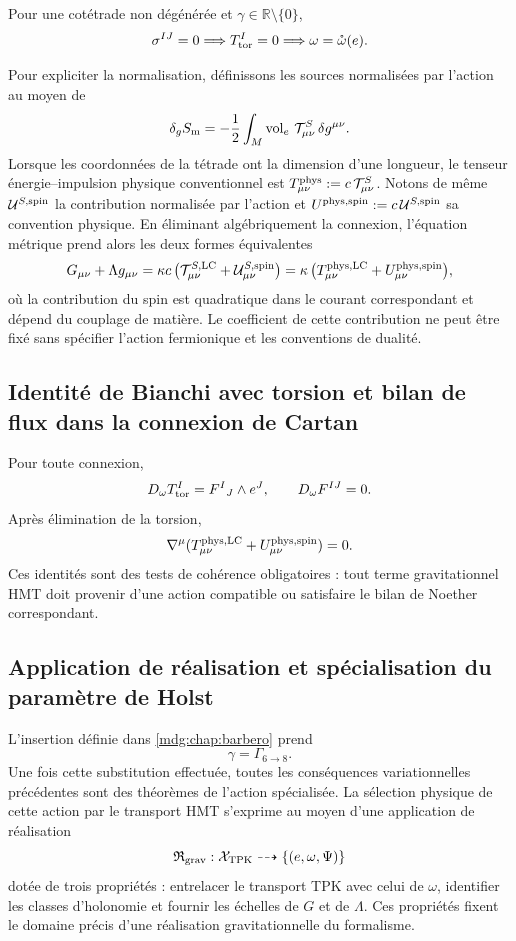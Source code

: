 \begin{corollary}
Pour une cotétrade non dégénérée et \(\gamma\in\mathbb R\setminus\{0\}\),
\[
 \sigma^{IJ}=0\Longrightarrow T_{\rm tor}^I=0
 \Longrightarrow\omega=\mathring\omega(e).
\]
\end{corollary}

Pour expliciter la normalisation, définissons les sources normalisées par l’action au moyen de
\[
 \delta_g S_{\rm m}
 =-\frac12\int_M\operatorname{vol}_e\,
 \mathcal T^{S}_{\mu\nu}\,\delta g^{\mu\nu}.
\]
Lorsque les coordonnées de la tétrade ont la dimension d’une longueur, le tenseur énergie--impulsion physique conventionnel est \(T^{\rm phys}_{\mu\nu}:=c\,\mathcal T^{S}_{\mu\nu}\). Notons de même \(\mathcal U^{S,\rm spin}\) la contribution normalisée par l’action et \(U^{\rm phys,\rm spin}:=c\,\mathcal U^{S,\rm spin}\) sa convention physique. En éliminant algébriquement la connexion, l’équation métrique prend alors les deux formes équivalentes
\[
 G_{\mu\nu}+\Lambda g_{\mu\nu}
 =\kappa c\,
 \bigl(\mathcal T_{\mu\nu}^{S,\rm LC}
       +\mathcal U_{\mu\nu}^{S,\rm spin}\bigr)
 =\kappa\,
 \bigl(T_{\mu\nu}^{\rm phys,LC}
       +U_{\mu\nu}^{\rm phys,spin}\bigr),
\]
où la contribution du spin est quadratique dans le courant correspondant et dépend du couplage de matière. Le coefficient de cette contribution ne peut être fixé sans spécifier l’action fermionique et les conventions de dualité.

\subsection{Identité de Bianchi avec torsion et bilan de flux dans la connexion de Cartan}

Pour toute connexion,
\[
 D_\omega T_{\rm tor}^I=F^I{}_J\wedge e^J,
 \qquad
 D_\omega F^{IJ}=0.
\]
Après élimination de la torsion,
\[
\nabla^\mu(T_{\mu\nu}^{\rm phys,LC}
          +U_{\mu\nu}^{\rm phys,spin})=0.
\]
Ces identités sont des tests de cohérence obligatoires : tout terme gravitationnel HMT doit provenir d’une action compatible ou satisfaire le bilan de Noether correspondant.

\subsection{Application de réalisation et spécialisation du paramètre de Holst}

L’insertion définie dans \cref{mdg:chap:barbero} prend
\[
 \gamma=\Gamma_{6\to8}.
\]
Une fois cette substitution effectuée, toutes les conséquences variationnelles précédentes sont des théorèmes de l’action spécialisée. La sélection physique de cette action par le transport HMT s’exprime au moyen d’une application de réalisation
\[
 \mathfrak R_{\rm grav}:\mathcal X_{\rm TPK}
 \dashrightarrow\{(e,\omega,\Psi)\}
\]
dotée de trois propriétés : entrelacer le transport TPK avec celui de \(\omega\), identifier les classes d’holonomie et fournir les échelles de \(G\) et de \(\Lambda\). Ces propriétés fixent le domaine précis d’une réalisation gravitationnelle du formalisme.


